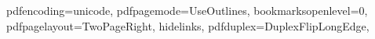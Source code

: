 
\hypersetup
		{
			pdfencoding=unicode,
			pdfpagemode=UseOutlines,
			bookmarksopenlevel=0,
			pdfpagelayout=TwoPageRight,
			hidelinks,
			pdfduplex=DuplexFlipLongEdge,
		}
